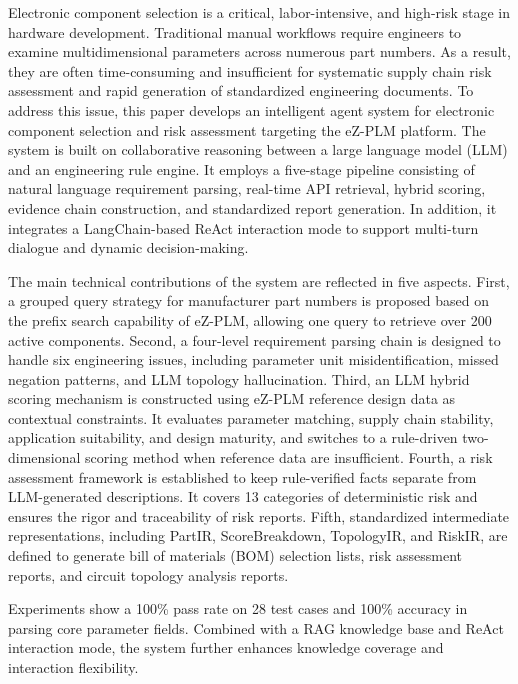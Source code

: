 
Electronic component selection is a critical, labor-intensive, and high-risk stage in hardware development. Traditional manual workflows require engineers to examine multidimensional parameters across numerous part numbers. As a result, they are often time-consuming and insufficient for systematic supply chain risk assessment and rapid generation of standardized engineering documents. To address this issue, this paper develops an intelligent agent system for electronic component selection and risk assessment targeting the eZ-PLM platform. The system is built on collaborative reasoning between a large language model (LLM) and an engineering rule engine. It employs a five-stage pipeline consisting of natural language requirement parsing, real-time API retrieval, hybrid scoring, evidence chain construction, and standardized report generation. In addition, it integrates a LangChain-based ReAct interaction mode to support multi-turn dialogue and dynamic decision-making.

The main technical contributions of the system are reflected in five aspects. First, a grouped query strategy for manufacturer part numbers is proposed based on the prefix search capability of eZ-PLM, allowing one query to retrieve over 200 active components. Second, a four-level requirement parsing chain is designed to handle six engineering issues, including parameter unit misidentification, missed negation patterns, and LLM topology hallucination. Third, an LLM hybrid scoring mechanism is constructed using eZ-PLM reference design data as contextual constraints. It evaluates parameter matching, supply chain stability, application suitability, and design maturity, and switches to a rule-driven two-dimensional scoring method when reference data are insufficient. Fourth, a risk assessment framework is established to keep rule-verified facts separate from LLM-generated descriptions. It covers 13 categories of deterministic risk and ensures the rigor and traceability of risk reports. Fifth, standardized intermediate representations, including PartIR, ScoreBreakdown, TopologyIR, and RiskIR, are defined to generate bill of materials (BOM) selection lists, risk assessment reports, and circuit topology analysis reports.

Experiments show a 100\% pass rate on 28 test cases and 100\% accuracy in parsing core parameter fields. Combined with a RAG knowledge base and ReAct interaction mode, the system further enhances knowledge coverage and interaction flexibility.